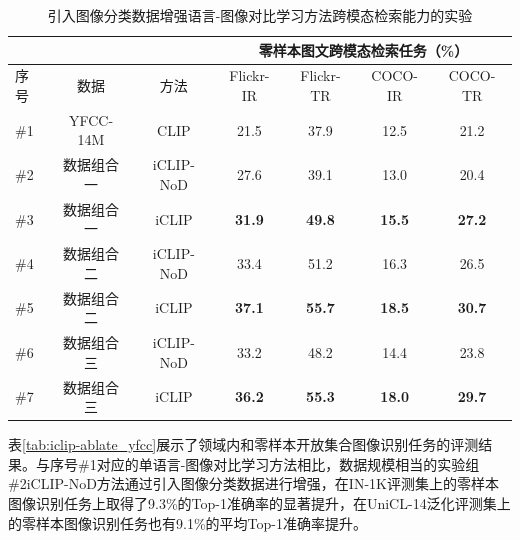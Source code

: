 \begin{table}
    \centering
    \caption{引入图像分类数据增强语言-图像对比学习方法跨模态检索能力的实验}
    \begin{tabular}{lcccccc}
    \toprule
        \multicolumn{1}{c}{} &
        \multicolumn{1}{c}{} & \multicolumn{1}{c}{} & \multicolumn{4}{c}{零样本图文跨模态检索任务（\%）} \\
        \midrule
        序号 & 数据 & 方法 & Flickr-IR & Flickr-TR & COCO-IR & COCO-TR    \\
        \midrule
        \#1 & YFCC-14M & CLIP  & 21.5 & 37.9 & 12.5 & 21.2  \\

        \#2 & 数据组合一 & iCLIP-NoD  & 27.6 & 39.1 & 13.0 & 20.4 \\  
                
        \#3 & 数据组合一 & iCLIP & \textbf{31.9} & \textbf{49.8} & \textbf{15.5} & \textbf{27.2} \\    
        
        \midrule
        
        \#4 & 数据组合二 & iCLIP-NoD & 33.4 & 51.2 & 16.3 & 26.5  \\  
                
        \#5 & 数据组合二 & iCLIP & \textbf{37.1} & \textbf{55.7} & \textbf{18.5} & \textbf{30.7} \\   
        
        \midrule
        
        \#6 & 数据组合三 & iCLIP-NoD & 33.2 & 48.2 & 14.4 & 23.8 \\
        
        \#7 & 数据组合三 & iCLIP & \textbf{36.2} & \textbf{55.3} & \textbf{18.0} & \textbf{29.7} \\

        \bottomrule
    \end{tabular}
    \label{tab:iclip-ablate_yfcc_retrieval}
\end{table}
表\ref{tab:iclip-ablate_yfcc}展示了领域内和零样本开放集合图像识别任务的评测结果。与序号\#1对应的单语言-图像对比学习方法相比，数据规模相当的实验组\#2iCLIP-NoD方法通过引入图像分类数据进行增强，在IN-1K评测集上的零样本图像识别任务上取得了9.3\%的Top-1准确率的显著提升，在UniCL-14泛化评测集上的零样本图像识别任务也有9.1\%的平均Top-1准确率提升。

